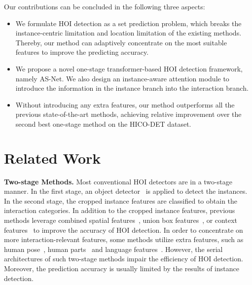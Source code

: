 \documentclass[final]{cvpr}
\begin{document}
Our contributions can be concluded in the following three aspects:
\begin{itemize}
\item We formulate HOI detection as a set prediction problem, which breaks the instance-centric limitation and location limitation of the existing methods. Thereby, our method can adaptively concentrate on the most suitable features to improve the predicting accuracy.
\item We propose a novel one-stage transformer-based HOI detection framework, namely AS-Net. We also design an instance-aware attention module to introduce the information in the instance branch into the interaction branch. 
\item Without introducing any extra features, our method outperforms all the previous state-of-the-art methods, achieving  relative improvement over the second best one-stage method on the HICO-DET dataset.
\end{itemize}

\vspace{-2mm}\section{Related Work}
\vspace{-1mm}
\noindent\textbf{Two-stage Methods.} 
Most conventional HOI detectors are in a two-stage manner. In the first stage, an object detector~\cite{girshick2015fast, ren2015faster, Dong_2020_CVPR} is applied to detect the instances. In the second stage, the cropped instance features are classified to obtain the interaction categories. In addition to the cropped instance features, previous methods leverage combined spatial features~\cite{chao2018learning, gkioxari2018detecting, gao2018ican, Gupta_2019_ICCV, Gao-ECCV-DRG, hou2020visual, zhong2020polysemy}, union box features~\cite{qi2018learning, Wan_2019_ICCV}, or context features~\cite{gao2018ican, Wang_2019_ICCV, Liu20a} to improve the accuracy of HOI detection. In order to concentrate on more interaction-relevant features, some methods utilize extra features, such as human pose~\cite{shen2018scaling, feng2019turbo, Li_2019_CVPR, Gupta_2019_ICCV}, human parts~\cite{Zhou_2019_ICCV, Wan_2019_ICCV, li2020detailed} and language features~\cite{Xu_2019_CVPR, Gao-ECCV-DRG, Liu20a, kim2020detecting}. However, the serial architectures of such two-stage methods impair the efficiency of HOI detection. Moreover, the prediction accuracy is usually limited by the results of instance detection.
\end{document}
